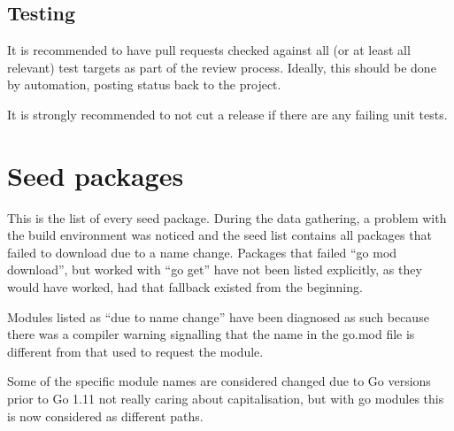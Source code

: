 \documentclass[a4paper]{paper}
\begin{document}
\subsection{Testing}

It is recommended to have pull requests checked against all (or at
least all relevant) test targets as part of the review
process. Ideally, this should be done by automation, posting status
back to the project.

It is strongly recommended to not cut a release if there are any
failing unit tests.

\section{Seed packages}

This is the list of every seed package. During the data gathering, a
problem with the build environment was noticed and the seed list
contains all packages that failed to download due to a name
change. Packages that failed ``go mod download'', but worked with ``go
get'' have not been listed explicitly, as they would have worked, had
that fallback existed from the beginning.

Modules listed as ``due to name change'' have been diagnosed as such
because there was a compiler warning signalling that the name in the
go.mod file is different from that used to request the module.

Some of the specific module names are considered changed due to Go
versions prior to Go 1.11 not really caring about capitalisation, but
with go modules this is now considered as different paths.


\end{document}
